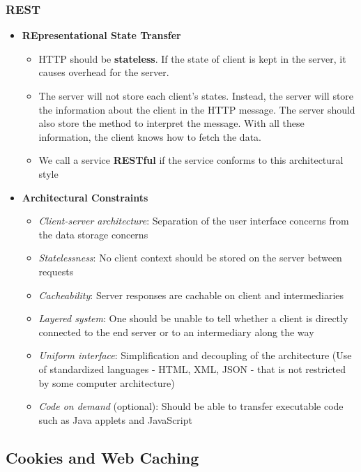 \subsubsection{REST}
\begin{itemize}
	\item \textbf{REpresentational State Transfer}
	\begin{itemize}
		\item HTTP should be \textbf{stateless}. If the state of client is kept in the server, it causes overhead for the server.
		\item The server will not store each client's states. Instead, the server will store the information about the client in the HTTP message. The server should also store the method to interpret the message. With all these information, the client knows how to fetch the data.
		\item We call a service \textbf{RESTful} if the service conforms to this architectural style
	\end{itemize}
	\item \textbf{Architectural Constraints}
	\begin{itemize}
		\item \textit{Client-server architecture}: Separation of the user interface concerns from the data storage concerns
		\item \textit{Statelessness}: No client context should be stored on the server between requests
		\item \textit{Cacheability}: Server responses are cachable on client and intermediaries
		\item \textit{Layered system}: One should be unable to tell whether a client is directly connected to the end server or to an intermediary along the way
		\item \textit{Uniform interface}: Simplification and decoupling of the architecture (Use of standardized languages - HTML, XML, JSON - that is not restricted by some computer architecture)
		\item \textit{Code on demand} (optional): Should be able to transfer executable code such as Java applets and JavaScript
	\end{itemize}
\end{itemize}

\subsection{Cookies and Web Caching}



























